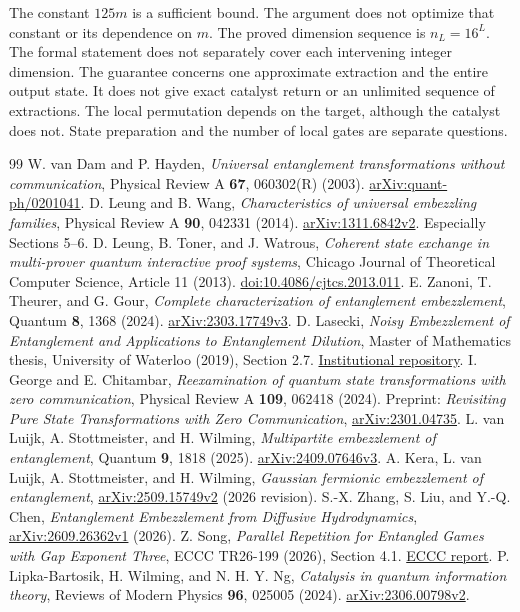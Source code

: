 \documentclass[11pt]{article}
\begin{document}
The constant $125m$ is a sufficient bound. The argument does not optimize that constant or its dependence on $m$. The proved dimension sequence is $n_L=16^L$. The formal statement does not separately cover each intervening integer dimension. The guarantee concerns one approximate extraction and the entire output state. It does not give exact catalyst return or an unlimited sequence of extractions. The local permutation depends on the target, although the catalyst does not. State preparation and the number of local gates are separate questions.


\begin{thebibliography}{99}\small
{} W. van Dam and P. Hayden, \emph{Universal entanglement transformations without communication}, Physical Review A \textbf{67}, 060302(R) (2003). \href{https://arxiv.org/abs/quant-ph/0201041}{arXiv:quant-ph/0201041}.
 D. Leung and B. Wang, \emph{Characteristics of universal embezzling families}, Physical Review A \textbf{90}, 042331 (2014). \href{https://arxiv.org/abs/1311.6842}{arXiv:1311.6842v2}. Especially Sections 5--6.
 D. Leung, B. Toner, and J. Watrous, \emph{Coherent state exchange in multi-prover quantum interactive proof systems}, Chicago Journal of Theoretical Computer Science, Article 11 (2013). \href{https://doi.org/10.4086/cjtcs.2013.011}{doi:10.4086/cjtcs.2013.011}.
 E. Zanoni, T. Theurer, and G. Gour, \emph{Complete characterization of entanglement embezzlement}, Quantum \textbf{8}, 1368 (2024). \href{https://arxiv.org/abs/2303.17749}{arXiv:2303.17749v3}.
 D. Lasecki, \emph{Noisy Embezzlement of Entanglement and Applications to Entanglement Dilution}, Master of Mathematics thesis, University of Waterloo (2019), Section 2.7. \href{https://uwspace.uwaterloo.ca/bitstreams/fad1b354-e7b6-49be-9cfd-0f97c0055d4f/download}{Institutional repository}.
 I. George and E. Chitambar, \emph{Reexamination of quantum state transformations with zero communication}, Physical Review A \textbf{109}, 062418 (2024). Preprint: \emph{Revisiting Pure State Transformations with Zero Communication}, \href{https://arxiv.org/abs/2301.04735}{arXiv:2301.04735}.
 L. van Luijk, A. Stottmeister, and H. Wilming, \emph{Multipartite embezzlement of entanglement}, Quantum \textbf{9}, 1818 (2025). \href{https://arxiv.org/abs/2409.07646}{arXiv:2409.07646v3}.
 A. Kera, L. van Luijk, A. Stottmeister, and H. Wilming, \emph{Gaussian fermionic embezzlement of entanglement}, \href{https://arxiv.org/abs/2509.15749}{arXiv:2509.15749v2} (2026 revision).
 S.-X. Zhang, S. Liu, and Y.-Q. Chen, \emph{Entanglement Embezzlement from Diffusive Hydrodynamics}, \href{https://arxiv.org/abs/2609.26362}{arXiv:2609.26362v1} (2026).
 Z. Song, \emph{Parallel Repetition for Entangled Games with Gap Exponent Three}, ECCC TR26-199 (2026), Section 4.1. \href{https://eccc.weizmann.ac.il/report/2026/199/download}{ECCC report}.
 P. Lipka-Bartosik, H. Wilming, and N. H. Y. Ng, \emph{Catalysis in quantum information theory}, Reviews of Modern Physics \textbf{96}, 025005 (2024). \href{https://arxiv.org/abs/2306.00798}{arXiv:2306.00798v2}.
\end{thebibliography}
\end{document}

